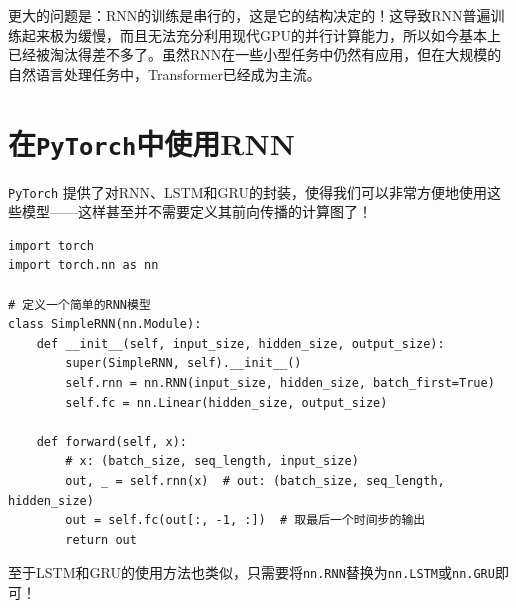 更大的问题是：RNN的训练是串行的，这是它的结构决定的！这导致RNN普遍训练起来极为缓慢，而且无法充分利用现代GPU的并行计算能力，所以如今基本上已经被淘汰得差不多了。虽然RNN在一些小型任务中仍然有应用，但在大规模的自然语言处理任务中，Transformer已经成为主流。

\section{在\texttt{PyTorch}中使用RNN}

\texttt{PyTorch} 提供了对RNN、LSTM和GRU的封装，使得我们可以非常方便地使用这些模型——这样甚至并不需要定义其前向传播的计算图了！

\begin{verbatim}
import torch
import torch.nn as nn

# 定义一个简单的RNN模型
class SimpleRNN(nn.Module):
    def __init__(self, input_size, hidden_size, output_size):
        super(SimpleRNN, self).__init__()
        self.rnn = nn.RNN(input_size, hidden_size, batch_first=True)
        self.fc = nn.Linear(hidden_size, output_size)

    def forward(self, x):
        # x: (batch_size, seq_length, input_size)
        out, _ = self.rnn(x)  # out: (batch_size, seq_length, hidden_size)
        out = self.fc(out[:, -1, :])  # 取最后一个时间步的输出
        return out
\end{verbatim}

至于LSTM和GRU的使用方法也类似，只需要将\texttt{nn.RNN}替换为\texttt{nn.LSTM}或\texttt{nn.GRU}即可！